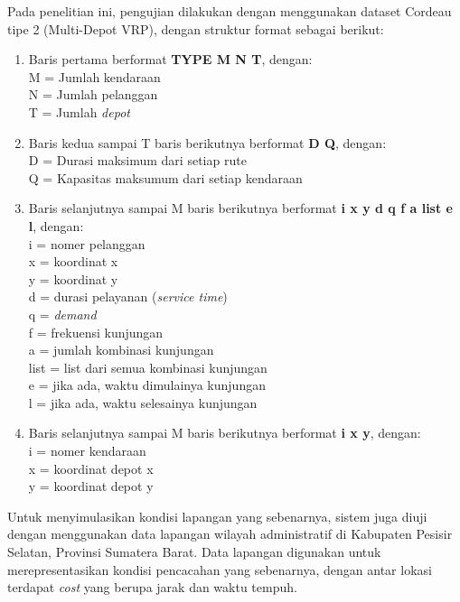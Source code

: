 Pada penelitian ini, pengujian dilakukan dengan menggunakan dataset Cordeau tipe 2 (Multi-Depot VRP), dengan struktur format sebagai berikut:
\begin{enumerate}
	\item Baris pertama berformat \textbf{TYPE M N T}, dengan: \\
	M = Jumlah kendaraan \\
	N = Jumlah pelanggan \\
	T = Jumlah \textit{depot}
	
	\item Baris kedua sampai T baris berikutnya berformat \textbf{D Q}, dengan: \\
	D = Durasi maksimum dari setiap rute \\
	Q = Kapasitas maksumum dari setiap kendaraan
	
	\item Baris selanjutnya sampai M baris berikutnya berformat \textbf{i x y d q f a list e l}, dengan: \\
	i	= nomer pelanggan \\
	x	= koordinat x \\
	y	= koordinat y \\
	d	= durasi pelayanan (\textit{service time}) \\
	q	= \textit{demand} \\
	f	= frekuensi kunjungan \\
	a	= jumlah kombinasi kunjungan \\
	list	= list dari semua kombinasi kunjungan \\
	e	= jika ada, waktu dimulainya kunjungan \\
	l	= jika ada, waktu selesainya kunjungan
	
	\item Baris selanjutnya sampai M baris berikutnya berformat \textbf{i x y}, dengan: \\
	i	= nomer kendaraan \\
	x	= koordinat depot x \\
	y	= koordinat depot y \\
\end{enumerate}

Untuk menyimulasikan kondisi lapangan yang sebenarnya, sistem juga diuji dengan menggunakan data lapangan wilayah administratif di Kabupaten Pesisir Selatan, Provinsi Sumatera Barat. Data lapangan digunakan untuk merepresentasikan kondisi pencacahan yang sebenarnya, dengan antar lokasi terdapat \textit{cost} yang berupa jarak dan waktu tempuh.

